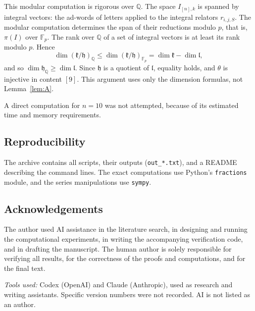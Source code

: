 \documentclass[11pt]{amsart}
\theoremstyle{definition}
\theoremstyle{remark}
\newcommand{\Q}{\mathbb{Q}}
\newcommand{\h}{\mathfrak{h}}
\newcommand{\lie}{\mathfrak{l}}
\newcommand{\kr}{\mathfrak{k}}
\begin{document}
This modular computation is rigorous over $\Q$. The space $I_{[n],k}$ is spanned by integral vectors: the ad-words of letters applied to the integral relators $r_{i,j,S}$. The modular computation determines the span of their reductions modulo $p$, that is, $\pi(I)$ over $\mathbb F_p$. The rank over $\Q$ of a set of integral vectors is at least its rank modulo $p$. Hence
\[
\dim(\kr/\h)_\Q\le\dim(\kr/\h)_{\mathbb F_p}=\dim\kr-\dim\lie,
\]
and so $\dim\h_\Q\ge\dim\lie$. Since $\h$ is a quotient of $\lie$, equality holds, and $\theta$ is injective in content $[9]$. This argument uses only the dimension formulas, not Lemma~\ref{lem:A}.

A direct computation for $n=10$ was not attempted, because of its estimated time and memory requirements.

\subsection*{Reproducibility}
The archive contains all scripts, their outputs (\texttt{out\_*.txt}), and a README describing the command lines. The exact computations use Python's \texttt{fractions} module, and the series manipulations use \texttt{sympy}.

\subsection*{Acknowledgements}
The author used AI assistance in the literature search, in designing and running the computational experiments, in writing the accompanying verification code, and in drafting the manuscript. The human author is solely responsible for verifying all results, for the correctness of the proofs and computations, and for the final text.

\noindent\textit{Tools used:} Codex (OpenAI) and Claude (Anthropic), used as research and writing assistants. Specific version numbers were not recorded. AI is not listed as an author.
\end{document}
